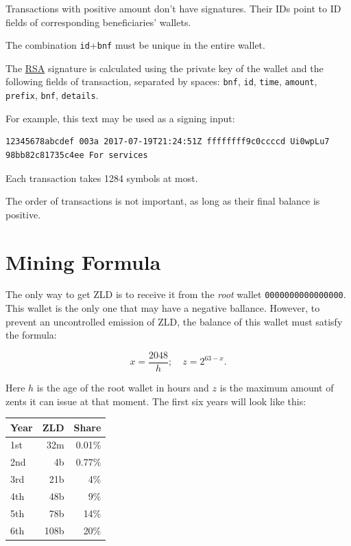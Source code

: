 \documentclass[11pt,oneside]{article}
\newcommand\dd[1]{\colorbox{gray!30}{\texttt{#1}}}
\begin{document}
Transactions with positive amount don't have signatures.
Their IDs point to ID fields of corresponding beneficiaries' wallets.

The combination \dd{id}+\dd{bnf}
must be unique in the entire wallet.

The \href{https://en.wikipedia.org/wiki/RSA_(cryptosystem)}{RSA}
signature is calculated using the private key of the
wallet and the following fields of transaction, separated by spaces:
\dd{bnf}, \dd{id}, \dd{time}, \dd{amount}, \dd{prefix}, \dd{bnf}, \dd{details}.

For example, this text may be used as a signing input:

\begin{verbatim}
12345678abcdef 003a 2017-07-19T21:24:51Z ffffffff9c0ccccd Ui0wpLu7 98bb82c81735c4ee For services
\end{verbatim}

Each transaction takes 1284 symbols at most.

The order of transactions is not important, as long as their final balance is positive.

\section{Mining Formula}

The only way to get ZLD is to receive it from the \emph{root} wallet \dd{0000000000000000}.
This wallet is the only one that may have a negative ballance.
However, to prevent an uncontrolled emission of ZLD, the balance
of this wallet must satisfy the formula:

$$x = \frac{2048}{h};\quad z = 2^{63 - x}.$$

Here $h$ is the age of the root wallet in hours and $z$ is the maximum
amount of zents it can issue at that moment. The first
six years will look like this:

\vspace{\parskip}\begin{center}\begin{tabular}{lrr}
\hline
Year & ZLD & Share \\
\hline
1st & 32m & 0.01\% \\
2nd & 4b & 0.77\% \\
3rd & 21b & 4\%\\
4th & 48b & 9\% \\
5th & 78b & 14\% \\
6th & 108b & 20\% \\
\hline
\end{tabular}\end{center}
\end{document}
